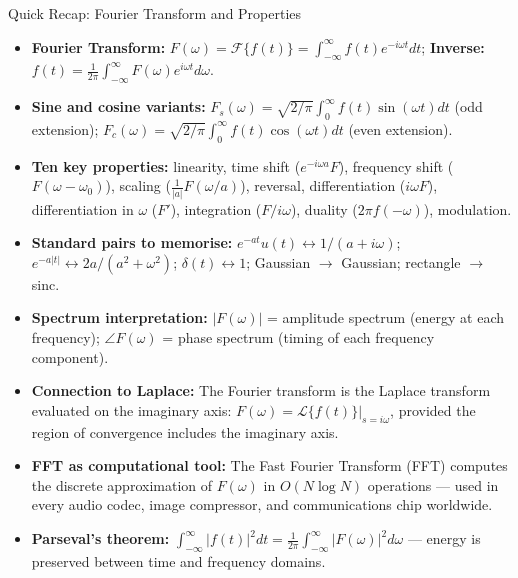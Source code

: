 \documentclass[12pt,a4paper]{article}
\begin{document}
\begin{learnbox}{Quick Recap: Fourier Transform and Properties}
\begin{itemize}[leftmargin=1.5em]
  \item \textbf{Fourier Transform:} $F(\omega) = \mathcal{F}\{f(t)\} = \int_{-\infty}^{\infty}f(t)e^{-i\omega t}dt$; \textbf{Inverse:} $f(t) = \frac{1}{2\pi}\int_{-\infty}^{\infty}F(\omega)e^{i\omega t}d\omega$.
  \item \textbf{Sine and cosine variants:} $F_s(\omega) = \sqrt{2/\pi}\int_0^\infty f(t)\sin(\omega t)dt$ (odd extension); $F_c(\omega) = \sqrt{2/\pi}\int_0^\infty f(t)\cos(\omega t)dt$ (even extension).
  \item \textbf{Ten key properties:} linearity, time shift ($e^{-i\omega a}F$), frequency shift ($F(\omega-\omega_0)$), scaling ($\frac{1}{|a|}F(\omega/a)$), reversal, differentiation ($i\omega F$), differentiation in $\omega$ ($F'$), integration ($F/i\omega$), duality ($2\pi f(-\omega)$), modulation.
  \item \textbf{Standard pairs to memorise:} $e^{-at}u(t)\leftrightarrow 1/(a+i\omega)$; $e^{-a|t|}\leftrightarrow 2a/(a^2+\omega^2)$; $\delta(t)\leftrightarrow 1$; Gaussian $\to$ Gaussian; rectangle $\to$ sinc.
  \item \textbf{Spectrum interpretation:} $|F(\omega)|$ = amplitude spectrum (energy at each frequency); $\angle F(\omega)$ = phase spectrum (timing of each frequency component).
  \item \textbf{Connection to Laplace:} The Fourier transform is the Laplace transform evaluated on the imaginary axis: $F(\omega) = \mathcal{L}\{f(t)\}\big|_{s=i\omega}$, provided the region of convergence includes the imaginary axis.
  \item \textbf{FFT as computational tool:} The Fast Fourier Transform (FFT) computes the discrete approximation of $F(\omega)$ in $O(N\log N)$ operations --- used in every audio codec, image compressor, and communications chip worldwide.
  \item \textbf{Parseval's theorem:} $\int_{-\infty}^{\infty}|f(t)|^2dt = \frac{1}{2\pi}\int_{-\infty}^{\infty}|F(\omega)|^2d\omega$ --- energy is preserved between time and frequency domains.
\end{itemize}
\end{learnbox}
\end{document}
